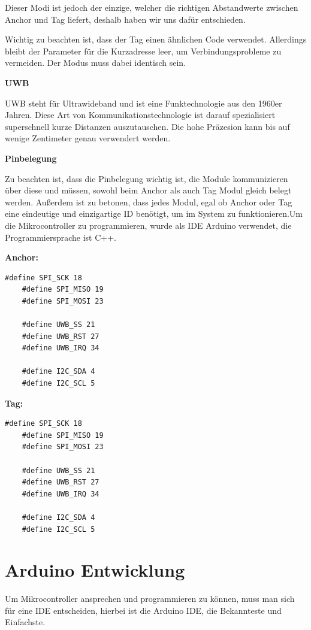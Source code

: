 Dieser Modi ist jedoch der einzige, welcher die richtigen Abstandwerte zwischen Anchor und Tag liefert, deshalb haben wir uns dafür entschieden.

Wichtig zu beachten ist, dass der Tag einen ähnlichen Code verwendet. Allerdings bleibt der Parameter für die Kurzadresse leer, um Verbindungsprobleme zu vermeiden. Der Modus muss dabei identisch sein.

\textbf{UWB}

UWB steht für Ultrawideband und ist eine Funktechnologie aus den 1960er Jahren. Diese Art von Kommunikationstechnologie ist darauf spezialisiert superschnell kurze Distanzen auszutauschen. Die hohe Präzesion kann bis auf wenige Zentimeter genau verwendert werden. \parencite{UWB}

\textbf{Pinbelegung}

Zu beachten ist, dass die Pinbelegung wichtig ist, die Module kommunizieren über diese und müssen, sowohl beim Anchor als auch Tag Modul gleich belegt werden. Außerdem ist zu betonen, dass jedes Modul, egal ob Anchor oder Tag eine eindeutige und einzigartige ID benötigt, um im System zu funktionieren.Um die Mikrocontroller zu programmieren, wurde als IDE Arduino verwendet, die Programmiersprache ist C++.

\textbf{Anchor:}
\begin{lstlisting}[style=C++, caption=Pinbelegung für Anchor, captionpos=b]
	#define SPI_SCK 18
	#define SPI_MISO 19
	#define SPI_MOSI 23
	
	#define UWB_SS 21
	#define UWB_RST 27
	#define UWB_IRQ 34 
	
	#define I2C_SDA 4
	#define I2C_SCL 5
\end{lstlisting}


\textbf{Tag:}
\begin{lstlisting}[style=C++, caption=Pinbelegung für Tag, captionpos=b]
	#define SPI_SCK 18
	#define SPI_MISO 19
	#define SPI_MOSI 23
	
	#define UWB_SS 21
	#define UWB_RST 27
	#define UWB_IRQ 34 
	
	#define I2C_SDA 4
	#define I2C_SCL 5
\end{lstlisting}

\section{Arduino Entwicklung}
Um Mikrocontroller ansprechen und programmieren zu können, muss man sich für eine IDE entscheiden, hierbei ist die Arduino IDE, \textcite{Arduino}
die Bekannteste und Einfachste.

